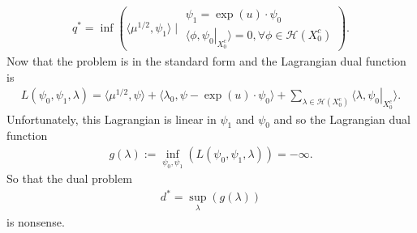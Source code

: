 \documentclass[12pt]{amsart}
\begin{document}
\begin{align*}
  q^* = \inf  \left( \langle \mu^{1/2} , \psi_1 \rangle \mid 
    \begin{array}{l}
      \psi_1 = \exp (u) \cdot \psi_0 \\
      \langle \phi , \left. \psi_0 \right|_{X_0^c} \rangle = 0 , \forall \phi \in \mathcal{H}(X_0^c)
    \end{array}
  \right).
\end{align*}
Now that the problem is in the standard form and the Lagrangian dual function is
\begin{align*}
  L(\psi_0,\psi_1,\lambda) = \langle \mu^{1/2} , \psi \rangle + \langle \lambda_0 , \psi - \exp(u) \cdot \psi_0 \rangle + \sum_{ \lambda \in \mathcal{H}( X_0^c) } \langle \lambda , \left. \psi_0 \right|_{X_0^c} \rangle.
\end{align*}
Unfortunately, this Lagrangian is linear in $\psi_1$ and $\psi_0$ and so the Lagrangian dual function
\begin{align*}
  g(\lambda) := \inf_{\psi_0,\psi_1}( L(\psi_0,\psi_1,\lambda) ) = -\infty.
\end{align*}
So that the dual problem
\begin{align*}
  d^* = \sup_\lambda( g(\lambda) )
\end{align*}
is nonsense.



\end{document}
